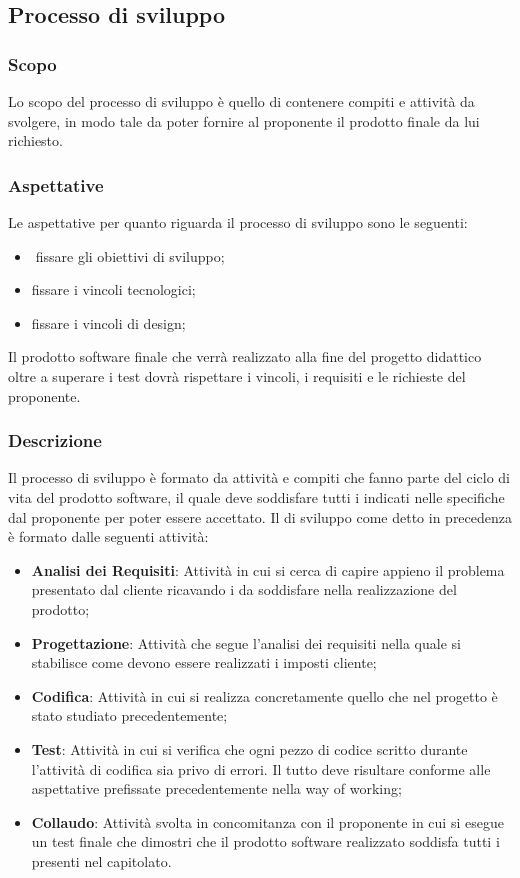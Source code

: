 

\subsection{Processo di sviluppo}
\subsubsection{Scopo}
Lo scopo del processo di sviluppo è quello di contenere compiti e attività da svolgere, in modo tale da poter fornire al proponente il prodotto finale da lui richiesto.\\
\subsubsection{Aspettative}
Le aspettative per quanto riguarda il processo di sviluppo sono le seguenti:
\begin{itemize}
	\item fissare gli obiettivi di sviluppo;
	\item	fissare i vincoli tecnologici;
	\item fissare i vincoli di design;
\end{itemize}
Il prodotto software finale che verrà realizzato alla fine del progetto didattico oltre a superare i test dovrà rispettare i vincoli, i requisiti e le richieste del proponente.
\subsubsection{Descrizione}
Il processo di sviluppo è formato da attività e compiti che fanno parte del ciclo di vita del prodotto software, il quale deve soddisfare tutti i  indicati nelle specifiche dal proponente per poter essere accettato.		
Il  di sviluppo come detto in precedenza è formato dalle seguenti attività:
\begin{itemize}
	\item \textbf{Analisi dei Requisiti}: Attività in cui si cerca di capire appieno il problema presentato dal cliente ricavando i  da soddisfare nella realizzazione del prodotto;
	\item \textbf{Progettazione}: Attività che segue l'analisi dei requisiti nella quale si stabilisce come devono essere realizzati i  imposti cliente;
	\item \textbf{Codifica}: Attività in cui si realizza concretamente quello che nel progetto è stato  studiato precedentemente;
	\item \textbf{Test}: Attività in cui si verifica che ogni pezzo di codice scritto durante l'attività di codifica sia privo di errori. Il tutto deve risultare conforme alle aspettative prefissate precedentemente nella way of working;
	\item \textbf{Collaudo}: Attività svolta in concomitanza con il proponente in cui si esegue un test finale che dimostri che il prodotto software realizzato soddisfa tutti i  presenti nel capitolato.
\end{itemize}



